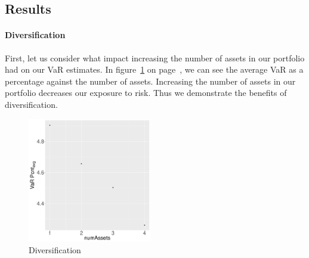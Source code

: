 \documentclass[../Dissertation.tex]{subfiles}
\begin{document}
\subsection{Results}

\paragraph{Diversification}
First, let us consider what impact increasing the number of assets in our portfolio had on our VaR estimates.
In figure~\ref{fig:diversification} on page~\pageref{fig:diversification}, we can see the average VaR as a percentage against the number of assets.
Increasing the number of assets in our portfolio decreases our exposure to risk.
Thus we demonstrate the benefits of diversification.
						\begin{figure}
								\caption{Diversification}
								\label{fig:diversification}
								\centering
								\includegraphics[width=0.48\textwidth]{./assets/Diversification.pdf}
						\end{figure}
\end{document}
